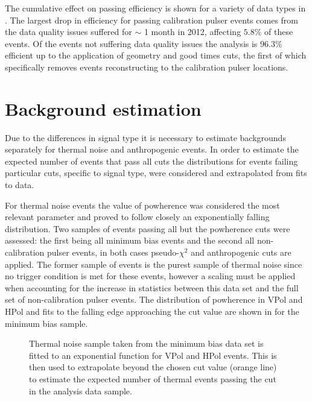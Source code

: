 The cumulative effect on passing efficiency is shown for a variety of data types in . The largest drop in efficiency for passing calibration pulser events comes from the data quality issues suffered for $\sim$ 1 month in 2012, affecting $5.8 \%$ of these events. Of the events not suffering data quality issues the analysis is $96.3 \%$ efficient up to the application of geometry and good times cuts, the first of which specifically removes events reconstructing to the calibration pulser locations.

\section{Background estimation}
\label{sec:Analysis:Background-Estimation}

Due to the differences in signal type it is necessary to estimate backgrounds separately for thermal noise and anthropogenic events. In order to estimate the expected number of events that pass all cuts the distributions for events failing particular cuts, specific to signal type, were considered and extrapolated from fits to data.

For thermal noise events the value of powherence was considered the most relevant parameter and proved to follow closely an exponentially falling distribution. Two samples of events passing all but the powherence cuts were assessed: the first being all minimum bias events and the second all non-calibration pulser events, in both cases pseudo-$\chi^{2}$ and anthropogenic cuts are applied. The former sample of events is the purest sample of thermal noise since no trigger condition is met for these events, however a scaling must be applied when accounting for the increase in statistics between this data set and the full set of non-calibration pulser events. The distribution of powherence in VPol and HPol and fits to the falling edge approaching the cut value are shown in  for the minimum bias sample. 

\begin{figure}[htpb]
\hfill
{}
\caption{Thermal noise sample taken from the minimum bias data set is fitted to an exponential function for VPol and HPol events. This is then used to extrapolate beyond the chosen cut value (orange line) to estimate the expected number of thermal events passing the cut in the analysis data sample.}
\label{fig:Analysis:Background-Estimation:Thermal-Background}
\end{figure}


